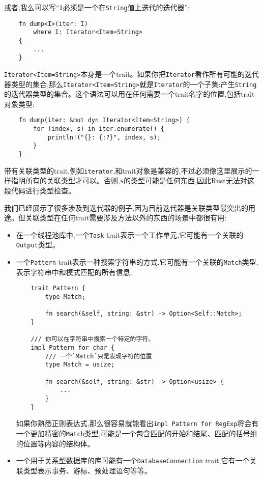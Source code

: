 或者,我么可以写“\texttt{I}必须是一个在\texttt{String}值上迭代的迭代器”:
\begin{verbatim}
    fn dump<I>(iter: I)
        where I: Iterator<Item=String>
    {
        ...
    }
\end{verbatim}

\texttt{Iterator<Item=String>}本身是一个trait。如果你把\texttt{Iterator}看作所有可能的迭代器类型的集合,那么\texttt{Iterator<Item=String>}就是\texttt{Iterator}的一个子集:产生\texttt{String}的迭代器类型的集合。这个语法可以用在任何需要一个trait名字的位置,包括trait对象类型:
\begin{verbatim}
    fn dump(iter: &mut dyn Iterator<Item=String>) {
        for (index, s) in iter.enumerate() {
            println!("{}: {:?}", index, s);
        }
    }
\end{verbatim}

带有关联类型的trait,例如\texttt{iterator},和trait对象是兼容的,不过必须像这里展示的一样指明所有的关联类型才可以。否则,\texttt{s}的类型可能是任何东西,因此Rust无法对这段代码进行类型检查。

我们已经展示了很多涉及到迭代器的例子,因为目前迭代器是关联类型最突出的用途。但关联类型在任何trait需要涉及方法以外的东西的场景中都很有用:

\begin{itemize}
    \item 在一个线程池库中,一个\texttt{Task} trait表示一个工作单元,它可能有一个关联的\texttt{Output}类型。
    \item 一个\texttt{Pattern} trait表示一种搜索字符串的方式,它可能有一个关联的\texttt{Match}类型,表示字符串中和模式匹配的所有信息:
    \begin{verbatim}
    trait Pattern {
        type Match;

        fn search(&self, string: &str) -> Option<Self::Match>;
    }

    /// 你可以在字符串中搜索一个特定的字符。
    impl Pattern for char {
        /// 一个`Match`只是发现字符的位置
        type Match = usize;

        fn search(&self, string: &str) -> Option<usize> {
            ...
        }
    }
    \end{verbatim}

    如果你熟悉正则表达式,那么很容易就能看出\texttt{impl Pattern for RegExp}将会有一个更加精密的\texttt{Match}类型,可能是一个包含匹配的开始和结尾、匹配的括号组的位置等内容的结构体。

    \item 一个用于关系型数据库的库可能有一个\texttt{DatabaseConnection} trait,它有一个关联类型表示事务、游标、预处理语句等等。
\end{itemize}

